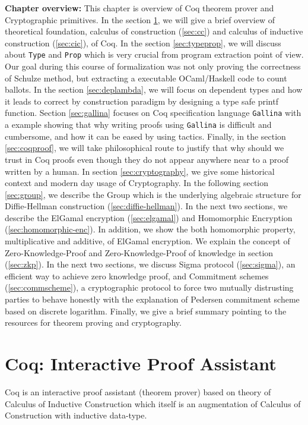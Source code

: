 \textbf{Chapter overview:}
 This chapter is overview of Coq theorem prover and Cryptographic primitives. 
 In the section \ref{sec:problemstatement}, we will give a brief overview of 
 theoretical foundation, calculus of construction (\ref{sec:cc}) and calculus of inductive 
 construction (\ref{sec:cic}), of Coq.  In the section \ref{sec:typeprop}, we will discuss about 
 \texttt{Type} and \texttt{Prop}
 which is very crucial from program extraction point of view.  Our goal during 
 this course of formalization was not only proving the correctness of 
 Schulze method, but extracting a executable OCaml/Haskell code to count 
 ballots.  In the section \ref{sec:deplambda}, we will focus 
 on dependent types and  how it leads to correct by construction paradigm
 by designing a  type safe printf function. 
 Section \ref{sec:gallina} focuses on Coq specification language 
 \texttt{Gallina} with a example showing that why writing proofs using  
 \texttt{Gallina} is difficult and cumbersome, and how it can be eased by 
 using tactics. Finally, in the section  \ref{sec:coqproof}, we will take 
 philosophical route to justify that why should we trust in Coq proofs 
 even though they do not appear anywhere near to a proof written by 
 a human.  In section \ref{sec:cryptography}, we give some historical 
 context and modern day usage of Cryptography.  In the following section 
 \ref{sec:group}, we describe the  Group which is the underlying 
 algebraic structure for Diffie-Hellman construction (\ref{sec:diffie-hellman}). 
 In the next two sections, we describe the ElGamal encryption (\ref{sec:elgamal}) 
 and Homomorphic Encryption (\ref{sec:homomorphic-enc}). In addition, 
 we show the both homomorphic property, multiplicative and additive, 
 of ElGamal encryption. We explain the concept of Zero-Knowledge-Proof 
 and Zero-Knowledge-Proof  of knowledge in section (\ref{sec:zkp}). 
 In the next two sections, we discuss Sigma protocol (\ref{sec:sigma}), 
 an efficient way to achieve zero knowledge proof, and Commitment schemes
 (\ref{sec:commscheme}), a cryptographic protocol to force two mutually 
 distrusting parties to behave honestly with the explanation of Pedersen 
 commitment scheme based on discrete logarithm.  Finally, we give a 
 brief summary pointing to the resources for theorem proving and 
 cryptography. 
 


\section{Coq: Interactive Proof Assistant}
\label{sec:problemstatement}
Coq  is an interactive proof assistant (theorem prover) based on
theory of Calculus of 
Inductive Construction \citep{Paulin-Mohring:1993:IDS:645891.671440} which itself is an 
augmentation of Calculus of Construction 
\citep{Coquand:1988:CC:47724.47725} with inductive data-type.  
 

